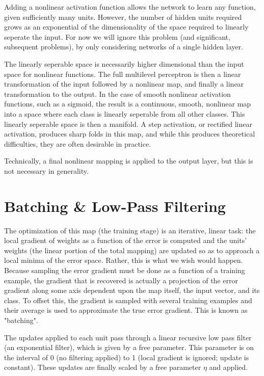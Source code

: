 \documentclass[10pt, conference, compsocconf]{IEEEtran}
\begin{document}
Adding a nonlinear activation function allows the network to learn any function, given sufficiently many units. However, the number of hidden units required grows as an exponential of the dimensionality of the space required to linearly seperate the input. For now we will ignore this problem (and significant, subsequent problems), by only considering networks of a single hidden layer.

The linearly seperable space is necessarily higher dimensional than the input space for nonlinear functions. The full multilevel perceptron is then a linear transformation of the input followed by a nonlinear map, and finally a linear transformation to the output. In the case of smooth nonlinear activation functions, such as a sigmoid, the result is a continuous, smooth, nonlinear map into a space where each class is linearly seperable from all other classes. This linearly seperable space is then a manifold. A step activation, or rectified linear activation, produces sharp folds in this map, and while this produces theoretical difficulties, they are often desirable in practice.

Technically, a final nonlinear mapping is applied to the output layer, but this is not necessary in generality.

\section{Batching \& Low-Pass Filtering}
The optimization of this map (the training stage) is an iterative, linear task: the local gradient of weights as a function of the error is computed and the units' weights (the linear portion of the total mapping) are updated so as to approach a local minima of the error space. Rather, this is what we wish would happen. Because sampling the error gradient must be done as a function of a training example, the gradient that is recovered is actually a projection of the error gradient along some axis dependent upon the map itself, the input vector, and its class. To offset this, the gradient is sampled with several training examples and their average is used to approximate the true error gradient. This is known as "batching".

The updates applied to each unit pass through a linear recursive low pass filter (an exponential filter), which is given by a free parameter. This parameter is on the interval of 0 (no filtering applied) to 1 (local gradient is ignored; update is constant). These updates are finally scaled by a free parameter $\eta$ and applied.
\end{document}
